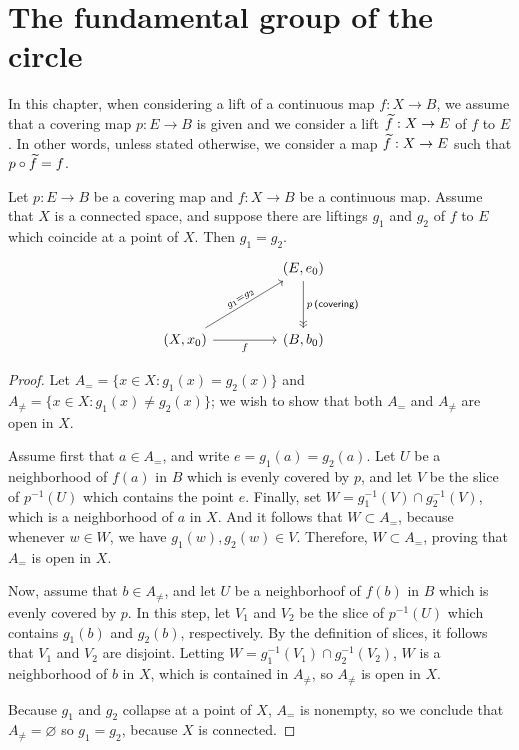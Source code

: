 \section{The fundamental group of the circle}

\begin{rmk}
    In this chapter, when considering a lift of a continuous map $f: X\rightarrow B$, we assume that a covering map $p: E\rightarrow B$ is given and we consider a lift $\widetilde{f}: X\rightarrow E$ of $f$ to $E$.
    In other words, unless stated otherwise, we consider a map $\widetilde{f}: X\rightarrow E$ such that $p\circ\widetilde{f}=f$.
\end{rmk}

\begin{thm}
    Let $p: E\rightarrow B$ be a covering map and $f: X\rightarrow B$ be a continuous map.
    Assume that $X$ is a connected space, and suppose there are liftings $g_1$ and $g_2$ of $f$ to $E$ which coincide at a point of $X$.
    Then $g_1=g_2$.
    \begin{equation*}
    \begin{tikzcd}[row sep=1.2cm, column sep=1.6cm]
        &
        (E, e_0)
        \arrow[d, "p\,\textsf{(covering)}", ->>]
        \\
        (X, x_0)
        \arrow[ur, "g_1=g_2"{sloped}]
        \arrow[r, "f"']
        &
        (B, b_0)
    \end{tikzcd}
    \end{equation*}
\end{thm}
\begin{proof}
    Let $A_{=}=\{x\in X: g_1(x)=g_2(x)\}$ and $A_{\neq}=\{x\in X: g_1(x)\neq g_2(x)\}$; we wish to show that both $A_{=}$ and $A_{\neq}$ are open in $X$.

    Assume first that $a\in A_{=}$, and write $e=g_1(a)=g_2(a)$.
    Let $U$ be a neighborhood of $f(a)$ in $B$ which is evenly covered by $p$, and let $V$ be the slice of $p^{-1}(U)$ which contains the point $e$.
    Finally, set $W=g_1^{-1}(V)\cap g_2^{-1}(V)$, which is a neighborhood of $a$ in $X$.
    And it follows that $W\subset A_{=}$, because whenever $w\in W$, we have $g_1(w), g_2(w)\in V$.
    Therefore, $W\subset A_{=}$, proving that $A_{=}$ is open in $X$.

    Now, assume that $b\in A_{\neq}$, and let $U$ be a neighborhoof of $f(b)$ in $B$ which is evenly covered by $p$.
    In this step, let $V_1$ and $V_2$ be the slice of $p^{-1}(U)$ which contains $g_1(b)$ and $g_2(b)$, respectively.
    By the definition of slices, it follows that $V_1$ and $V_2$ are disjoint.
    Letting $W=g_1^{-1}(V_1)\cap g_2^{-1}(V_2)$, $W$ is a neighborhood of $b$ in $X$, which is contained in $A_{\neq}$, so $A_{\neq}$ is open in $X$.

    Because $g_1$ and $g_2$ collapse at a point of $X$, $A_{=}$ is nonempty, so we conclude that $A_{\neq}=\varnothing$ so $g_1=g_2$, because $X$ is connected.
\end{proof}
